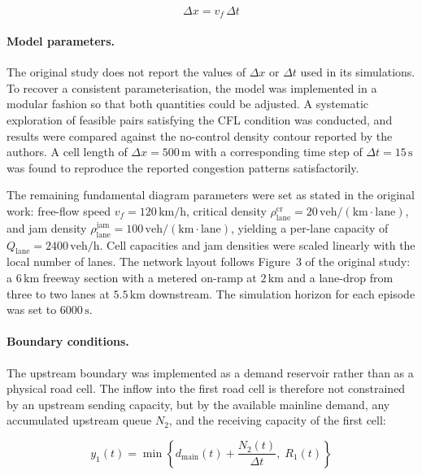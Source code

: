 \begin{equation}
    \Delta x = v_f\,\Delta t
\end{equation}

\paragraph{Model parameters.}

The original study does not report the values of $\Delta x$ or $\Delta t$ used
in its simulations. To recover a consistent parameterisation, the model was
implemented in a modular fashion so that both quantities could be adjusted. A systematic exploration of feasible pairs satisfying the CFL
condition was conducted, and results were compared against the no-control
density contour reported by the authors. A cell length of
$\Delta x = 500\,\mathrm{m}$ with a corresponding time step of
$\Delta t = 15\,\mathrm{s}$ was found to reproduce the reported congestion
patterns satisfactorily.

The remaining fundamental diagram parameters were set as stated in the original
work: free-flow speed $v_f = 120\,\mathrm{km/h}$, critical density
$\rho^{\mathrm{cr}}_{\mathrm{lane}} = 20\,\mathrm{veh/(km{\cdot}lane)}$, and
jam density
$\rho^{\mathrm{jam}}_{\mathrm{lane}} = 100\,\mathrm{veh/(km{\cdot}lane)}$,
yielding a per-lane capacity of $Q_{\mathrm{lane}} = 2400\,\mathrm{veh/h}$.
Cell capacities and jam densities were scaled linearly with the local number of
lanes. The network layout follows Figure~3 of the original study: a
$6\,\mathrm{km}$ freeway section with a metered on-ramp at $2\,\mathrm{km}$
and a lane-drop from three to two lanes at $5.5\,\mathrm{km}$ downstream. The simulation horizon for each episode was set to $6000\,\mathrm{s}$.


\paragraph{Boundary conditions.}

The upstream boundary was implemented as a demand reservoir rather than as a
physical road cell. The inflow into the first road cell is therefore not
constrained by an upstream sending capacity, but by the available mainline
demand, any accumulated upstream queue $N_2$, and the receiving capacity of
the first cell:

\begin{equation}
    y_1(t) = \min\!\left\{ d_{\mathrm{main}}(t) + \frac{N_2(t)}{\Delta t},\;
    R_1(t) \right\}
\end{equation}

